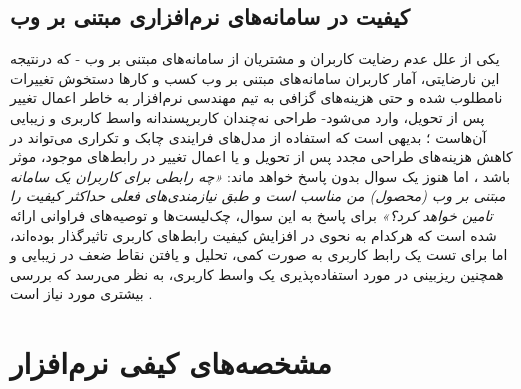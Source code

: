\subsection{کیفیت در سامانه‌های نرم‌افزاری مبتنی بر وب}
یکی از علل عدم رضایت کاربران و مشتریان از سامانه‌های مبتنی بر وب - که درنتیجه این نارضایتی، آمار کاربران سامانه‌های مبتنی بر وب کسب‌ و کارها دستخوش تغییرات نامطلوب شده و حتی هزینه‌های گزافی به تیم مهندسی نرم‌افزار به خاطر اعمال تغییر پس از تحویل، وارد می‌شود- طراحی نه‌چندان کاربرپسندانه واسط کاربری و زیبایی آن‌هاست 
\cite{agarwal_assessing_2002}؛
بدیهی است که استفاده از مدل‌های فرایندی چابک  و تکراری می‌تواند در کاهش هزینه‌های طراحی مجدد پس از تحویل و یا اعمال تغییر در رابط‌های موجود، موثر باشد
\cite{pressman_software_2015}،
 اما هنوز یک سوال بدون پاسخ خواهد ماند:
 \textit{«چه رابطی برای کاربران یک سامانه مبتنی بر وب (محصول) من مناسب است و طبق نیازمندی‌های فعلی حداکثر کیفیت را تامین خواهد کرد؟»}
 برای پاسخ به این سوال، چک‌لیست‌ها و توصیه‌های فراوانی ارائه شده است
  \cite{pressman_software_2015, sommerville_software_2016}
 که هرکدام به نحوی در افزایش کیفیت رابط‌های کاربری تاثیرگذار بوده‌اند، اما برای تست یک رابط کاربری به صورت کمی، تحلیل و یافتن نقاط ضعف در زیبایی و همچنین ریزبینی در مورد استفاده‌پذیری یک واسط کاربری، به نظر می‌رسد که بررسی بیشتری مورد نیاز است
 \cite{albert_measuring_2013}.
 
 \section{مشخصه‌های کیفی نرم‌افزار}
